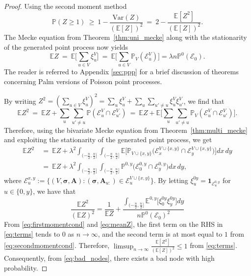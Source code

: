 \documentclass[letterpaper,11pt]{article}
\theoremstyle{definition}
\def\1{\mathbf{1}}
\def\E{\mathbb{E}}
\def\P{\mathbb{P}}
\def\bA{\bm{A}}
\newcommand{\bsigma}{\bm{\sigma}}
\def\cE{\mathcal{E}}
\def\weq{ \ = \ }
\def\wge{ \ \ge \ }
\numberwithin{equation}{section}
\newcommand{\la}{\lambda}
\theoremstyle{definition}
\def\1{\mathbf{1}}
\def\E{\mathbb{E}}
\def\P{\mathbb{P}}
\def\bA{\bm{A}}
\newcommand{\bsigma}{\bm{\sigma}}
\def\cE{\mathcal{E}}
\def\weq{ \ = \ }
\def\wge{ \ \ge \ }
\numberwithin{equation}{section}
\newcommand{\la}{\lambda}
\theoremstyle{thmstyletwo}%
\begin{document}
\begin{proof}
    Using the second moment method
\begin{equation}
\label{eq:bad_nodes}
\P(Z \ge 1)
\wge 1-\frac{\text{Var}(Z)}{(\E[Z])^2}
\weq 2 - \frac{\E[Z^2]}{(\E[Z])^2}.
\end{equation}
The Mecke equation from Theorem~\ref{thm:uni_mecke} along with the stationarity of the generated point process now yields
\begin{equation}
\E Z \weq \E \Big[\sum_{u \in V} \xi_{u}^V\Big] \weq \E \Big[\sum_{u \in V} \P_V(\cE_u^V)\Big] = \la n \P^0(\cE_0).
\label{eq:meanZ}
\end{equation}
The reader is referred to Appendix \ref{sec:ppp} for a brief discussion of theorems concerning Palm versions of Poisson point processes.

By writing $Z^2  = (\sum_{u\in V} \xi_u^V)^2 = \sum_u \xi_u^V + \sum_u \sum_{u'\ne u} \xi_u^V\xi_{u'}^V$, we find that
\begin{equation}
\E Z^2
\weq \E Z + \sum_u \sum_{u'\ne u} \P( \cE_u^V \cap \cE_{u'}^V )
\weq \E Z + \E \bigg[\sum_u \sum_{u'\ne u} \P_V( \cE_u^V \cap \cE_{u'}^V )\bigg].
\label{eq:Palm_second_moment}
\end{equation}
Therefore, using the bivariate Mecke equation from Theorem~\ref{thm:multi_mecke} and exploiting the stationarity of the generated point process, we get
\begin{align*}
\E Z^2
&\weq \E Z + \la^2 \int_{ (-\frac{n}{2}, \frac{n}{2}]} \int_{ (-\frac{n}{2}, \frac{n}{2}]}
\E \Big[ \P_{V\cup\{x,y\}}\big(\cE_x^{V\cup\{x,y\}} \cap \cE_y^{V\cup\{x,y\}}\big) \Big] dx \, dy \\
&\weq \E Z + \la^2 \int_{ (-\frac{n}{2}, \frac{n}{2}]} \int_{ (-\frac{n}{2}, \frac{n}{2}]}
\P^{0,y} \big( \cE_0^{0,y}\cap \cE_y^{0,y} \big) dx \, dy,
\end{align*}
where $\cE_u^{x,y} := \Big\{(V,\bsigma,\bA): (\bsigma,\bA_{u:})\in \cE_u^{V\cup \{x,y\}}\Big\}$. By letting $\xi^{0y}_u = \1_{\cE_u^{0,y}}$ for $u\in\{0,y\}$,  we have that
\begin{equation}
\frac{\E Z^2}{(\E Z)^2}
= \frac{1}{\E Z }
+ \frac{ \int_{ (-\frac{n}{2}, \frac{n}{2}]}
\E^{0,y} \Big[ \xi^{0y}_0 \xi^{0y}_y \Big] dy}{n \P^0(\cE_0)^2}
\label{eq:terms}
\end{equation}
From \eqref{eq:firstmomentcond} and \eqref{eq:meanZ}, the first term on the RHS in \eqref{eq:terms} tends to $0$ as $n\to \infty$, and the second term is at most equal to $1$ from \eqref{eq:secondmomentcond}. Therefore,  $\limsup_{n \to \infty} \frac{\E[Z^2]}{(\E[Z])^2} \le 1$ from \eqref{eq:terms}. Consequently, from \eqref{eq:bad_nodes}, there exists a bad node with high probability.
\end{proof}
\end{document}
